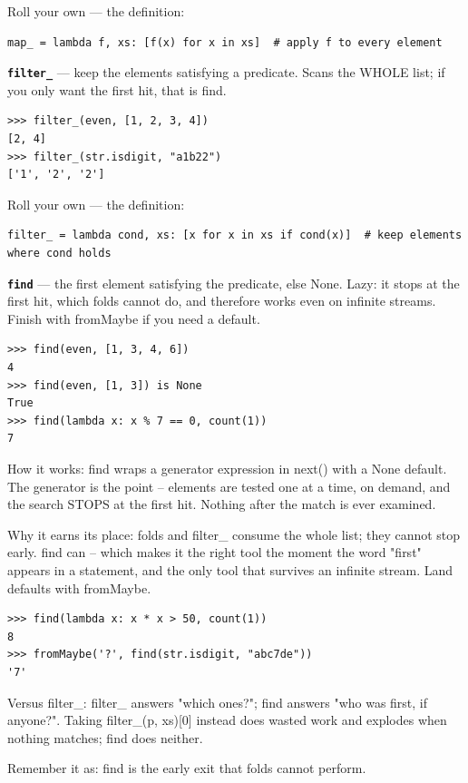 \documentclass[10pt,letterpaper]{article}
\begin{document}
Roll your own --- the definition:

\begin{lstlisting}[style=ex]
map_ = lambda f, xs: [f(x) for x in xs]  # apply f to every element
\end{lstlisting}
\textbf{\texttt{filter\_}} --- keep the elements satisfying a predicate. Scans the WHOLE list; if you only want the first hit, that is find.
\begin{lstlisting}[style=ex]
>>> filter_(even, [1, 2, 3, 4])
[2, 4]
>>> filter_(str.isdigit, "a1b22")
['1', '2', '2']
\end{lstlisting}

Roll your own --- the definition:

\begin{lstlisting}[style=ex]
filter_ = lambda cond, xs: [x for x in xs if cond(x)]  # keep elements where cond holds
\end{lstlisting}
\textbf{\texttt{find}} --- the first element satisfying the predicate, else None. Lazy: it stops at the first hit, which folds cannot do, and therefore works even on infinite streams. Finish with fromMaybe if you need a default.
\begin{lstlisting}[style=ex]
>>> find(even, [1, 3, 4, 6])
4
>>> find(even, [1, 3]) is None
True
>>> find(lambda x: x % 7 == 0, count(1))
7
\end{lstlisting}

How it works: find wraps a generator expression in next() with a None default. The generator is the point -- elements are tested one at a time, on demand, and the search STOPS at the first hit. Nothing after the match is ever examined.


Why it earns its place: folds and filter\_ consume the whole list; they cannot stop early. find can -- which makes it the right tool the moment the word "first" appears in a statement, and the only tool that survives an infinite stream. Land defaults with fromMaybe.

\begin{lstlisting}[style=ex]
>>> find(lambda x: x * x > 50, count(1))
8
>>> fromMaybe('?', find(str.isdigit, "abc7de"))
'7'
\end{lstlisting}

Versus filter\_: filter\_ answers "which ones?"; find answers "who was first, if anyone?". Taking filter\_(p, xs)[0] instead does wasted work and explodes when nothing matches; find does neither.


Remember it as: find is the early exit that folds cannot perform.
\end{document}
